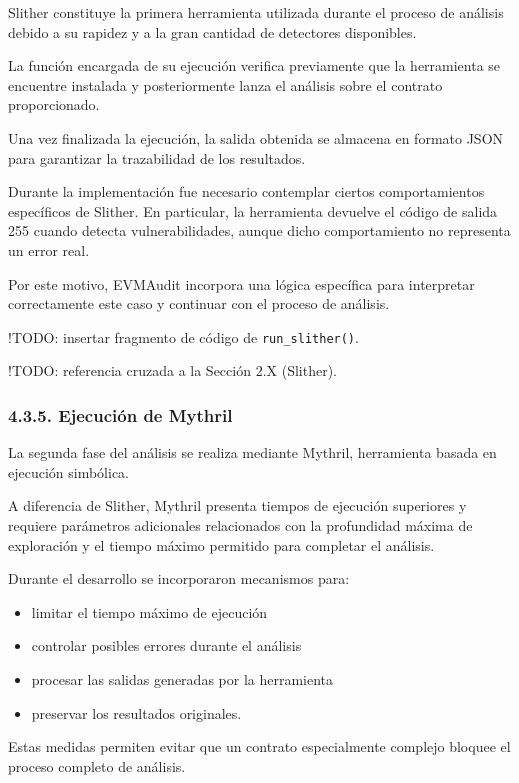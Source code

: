 Slither constituye la primera herramienta utilizada durante el proceso
de análisis debido a su rapidez y a la gran cantidad de detectores
disponibles.

La función encargada de su ejecución verifica previamente que la
herramienta se encuentre instalada y posteriormente lanza el análisis
sobre el contrato proporcionado.

Una vez finalizada la ejecución, la salida obtenida se almacena en
formato JSON para garantizar la trazabilidad de los resultados.

Durante la implementación fue necesario contemplar ciertos
comportamientos específicos de Slither. En particular, la herramienta
devuelve el código de salida 255 cuando detecta vulnerabilidades, aunque
dicho comportamiento no representa un error real.

Por este motivo, EVMAudit incorpora una lógica específica para
interpretar correctamente este caso y continuar con el proceso de
análisis.

!TODO: insertar fragmento de código de \texttt{run\_slither()}.

!TODO: referencia cruzada a la Sección 2.X (Slither).

\subsubsection{4.3.5. Ejecución de
Mythril}\label{ejecuciuxf3n-de-mythril}

La segunda fase del análisis se realiza mediante Mythril, herramienta
basada en ejecución simbólica.

A diferencia de Slither, Mythril presenta tiempos de ejecución
superiores y requiere parámetros adicionales relacionados con la
profundidad máxima de exploración y el tiempo máximo permitido para
completar el análisis.

Durante el desarrollo se incorporaron mecanismos para:

\begin{itemize}
\tightlist
\item
  limitar el tiempo máximo de ejecución
\item
  controlar posibles errores durante el análisis
\item
  procesar las salidas generadas por la herramienta
\item
  preservar los resultados originales.
\end{itemize}

Estas medidas permiten evitar que un contrato especialmente complejo
bloquee el proceso completo de análisis.

